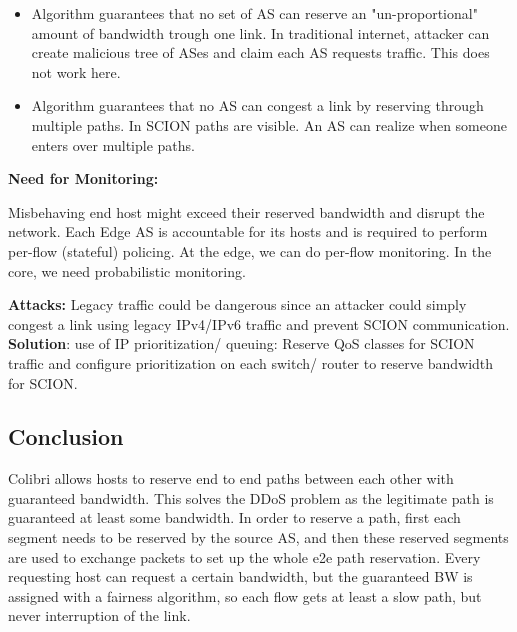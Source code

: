 \documentclass[11pt,oneside,a4paper]{article}
\begin{document}
\vspace{-\topsep}
\begin{itemize}
	\setlength{\itemsep}{0pt}
	\setlength{\parskip}{0pt}
	\item Algorithm guarantees that no set of AS can reserve an "un-proportional" amount of bandwidth trough one link. In traditional internet, attacker can create malicious tree of ASes and claim each AS requests traffic. This does not work here.
	\item Algorithm guarantees that no AS can congest a link by reserving through multiple paths. In SCION paths are visible. An AS can realize when someone enters over multiple paths.
\end{itemize}
\vspace{-\topsep}

\textbf{Need for Monitoring:}

Misbehaving end host might exceed their reserved bandwidth and disrupt the network. Each Edge AS is accountable for its hosts and is required to perform per-flow (stateful) policing. At the edge, we can do per-flow monitoring. In the core, we need probabilistic monitoring.

\newpage

\textbf{Attacks:} Legacy traffic could be dangerous since an attacker could simply congest a link using legacy IPv4/IPv6 traffic and prevent SCION communication.\\
\textbf{Solution}: use of IP prioritization/ queuing: Reserve QoS classes for SCION traffic and configure prioritization on each switch/ router to reserve bandwidth for SCION.

\subsection{Conclusion}

Colibri allows hosts to reserve end to end paths between each other with guaranteed bandwidth. This solves the DDoS problem as the legitimate path is guaranteed at least some bandwidth. In order to reserve a path, first each segment needs to be reserved by the source AS, and then these reserved segments are used to exchange packets to set up the whole e2e path reservation. Every requesting host can request a certain bandwidth, but the guaranteed BW is assigned with a fairness algorithm, so each flow gets at least a slow path, but never interruption of the link.
\end{document}
